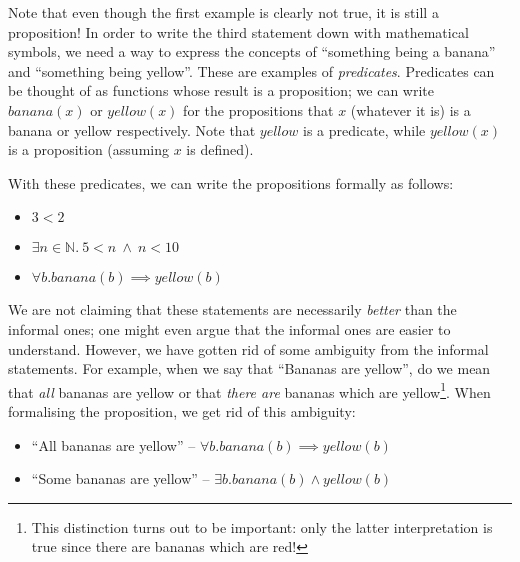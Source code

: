 \documentclass{tufte-handout}
\newcounter{example}
\begin{document}
\noindent
Note that even though the first example is clearly not true, it is
still a proposition!
%
In order to write the third statement down with mathematical
symbols, we need a way to express the concepts of ``something
being a banana'' and ``something being yellow''. These are
examples of \emph{predicates}. Predicates can be thought of as
functions whose result is a proposition; we can write
$\mathit{banana}(x)$ or $\mathit{yellow}(x)$ for the propositions
that $x$ (whatever it is) is a banana or yellow respectively. Note
that $\mathit{yellow}$ is a predicate, while $\mathit{yellow}(x)$
is a proposition (assuming $x$ is defined).


With these predicates, we can write the propositions formally as
follows:

\begin{itemize}
\item $3 < 2$
\item $\exists n \in \mathbb{N} .~ 5 < n ~\land~ n < 10$
\item $\forall b. \mathit{banana}(b) \implies \mathit{yellow}(b)$
\end{itemize}

\noindent
We are not claiming that these statements are necessarily
\emph{better} than the informal ones; one might even argue that
the informal ones are easier to understand. However, we have
gotten rid of some ambiguity from the informal statements.
%
For example, when we say that ``Bananas are yellow'', do we mean
that \emph{all} bananas are yellow or that \emph{there are}
bananas which are yellow\footnote{This distinction turns out to be
  important: only the latter interpretation is true since there
  are bananas which are red!}. When formalising the proposition,
we get rid of this ambiguity:

\begin{itemize}
\item ``All bananas are yellow'' -- $\forall b. \mathit{banana}(b) \implies \mathit{yellow}(b)$
\item ``Some bananas are yellow'' -- $\exists b. \mathit{banana}(b) \land \mathit{yellow}(b)$
\end{itemize}
\end{document}
